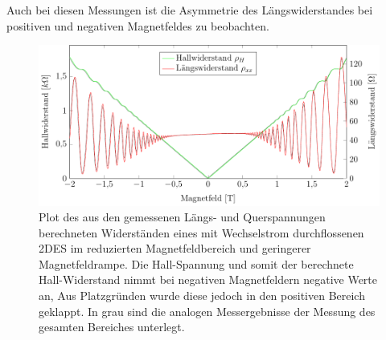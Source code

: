 Auch bei diesen Messungen ist die Asymmetrie des Längswiderstandes bei positiven und negativen Magnetfeldes zu beobachten.


\begin{figure}[h]
	\centering
	\includegraphics{graphs/ac/pm2T_range.pdf}
	\caption[Höher aufgelöste Gleichstrommessung in Magnetfeldteilbereich]{
		Plot des aus den gemessenen Längs- und Querspannungen berechneten Widerständen eines mit Wechselstrom durchflossenen 2DES im reduzierten Magnetfeldbereich und geringerer Magnetfeldrampe. Die Hall-Spannung und somit der berechnete Hall-Widerstand nimmt bei negativen Magnetfeldern negative Werte an, Aus Platzgründen wurde diese jedoch in den positiven Bereich geklappt. In grau sind die analogen Messergebnisse der Messung des gesamten Bereiches unterlegt.
	}
	\label{fig:2T_range_ac}
\end{figure}

